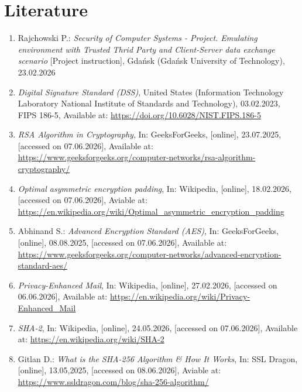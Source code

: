 \documentclass[12pt, a4paper]{report}
\begin{document}
\newpage
\section*{Literature}
\renewcommand{\labelenumi}{[\arabic{enumi}]}
\begin{enumerate}

\item Rajchowski P.: \textit{Security of Computer Systems - Project. Emulating environment with Trusted Thrid Party and Client-Server data exchange scenario} [Project instruction], Gdańsk (Gdańsk University of Technology), 23.02.2026

\item \textit{Digital Signature Standard (DSS)}, United States (Information Technology Laboratory National Institute of Standards and Technology), 03.02.2023, FIPS 186-5, Available at: \url{https://doi.org/10.6028/NIST.FIPS.186-5}

\item \textit{RSA Algorithm in Cryptography}, In: GeeksForGeeks, [online], 23.07.2025, [accessed on 07.06.2026], Available at: \url{https://www.geeksforgeeks.org/computer-networks/rsa-algorithm-cryptography/}

\item \textit{Optimal asymmetric encryption padding}, In: Wikipedia, [online], 18.02.2026, [accessed on 07.06.2026], Aviable at: \url{https://en.wikipedia.org/wiki/Optimal_asymmetric_encryption_padding}

\item Abhinand S.: \textit{Advanced Encryption Standard (AES)}, In: GeeksForGeeks, [online], 08.08.2025, [accessed on 07.06.2026], Available at: \url{https://www.geeksforgeeks.org/computer-networks/advanced-encryption-standard-aes/}

\item \textit{Privacy-Enhanced Mail}, In: Wikipedia, [online], 27.02.2026, [accessed on 06.06.2026], Available at: \url{https://en.wikipedia.org/wiki/Privacy-Enhanced_Mail}

\item \textit{SHA-2}, In: Wikipedia, [online], 24.05.2026, [accessed on 07.06.2026], Available at: \url{https://en.wikipedia.org/wiki/SHA-2}

\item Gitlan D.: \textit{What is the SHA-256 Algorithm \& How It Works}, In: SSL Dragon, [online], 13.05,2025, [accessed on 08.06.2026], Aviable at: \url{https://www.ssldragon.com/blog/sha-256-algorithm/}


\end{enumerate}
\end{document}
